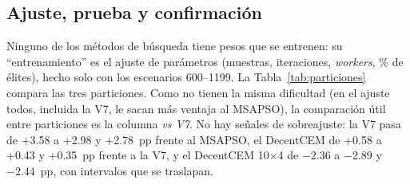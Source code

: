 \documentclass[letterpaper,11pt]{article}
\begin{document}
\subsection{Ajuste, prueba y confirmación}
Ninguno de los métodos de búsqueda tiene pesos que se entrenen: su ``entrenamiento'' es el ajuste de parámetros (muestras, iteraciones, \textit{workers}, \% de élites), hecho solo con los escenarios 600--1199. La Tabla~\ref{tab:particiones} compara las tres particiones. Como no tienen la misma dificultad (en el ajuste todos, incluida la V7, le sacan más ventaja al MSAPSO), la comparación útil entre particiones es la columna \textit{vs V7}. No hay señales de sobreajuste: la V7 pasa de +3.58 a +2.98 y +2.78~pp frente al MSAPSO, el DecentCEM de +0.58 a +0.43 y +0.35~pp frente a la V7, y el DecentCEM 10$\times$4 de $-2.36$ a $-2.89$ y $-2.44$~pp, con intervalos que se traslapan.

\begin{table}[H]
  \centering
  \caption{Energía entregada por partición (\% de la máxima alcanzable) y diferencias en pp con IC 95\,\% (bootstrap pareado). Los parámetros se eligieron solo con el ajuste.}
  \label{tab:particiones}
  \scriptsize
  \setlength{\tabcolsep}{3pt}
\end{table}
\end{document}
